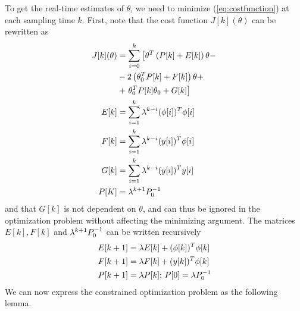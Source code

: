 \par
To get the real-time estimates of $\theta$, we need to minimize
(\ref{eq:costfunction}) at each sampling time $k$. First, note that the
cost function $J[k](\theta)$ can be rewritten as
\begin{equation}
    \begin{split}
        J[k](\theta) &= \sum\limits_{i=0}^k \left[
            \theta^T\left(P[k] + E[k]\right)\theta - \right.\\
        &- 2\left(\theta_0^TP[k] + F[k]\right)\theta +\\
        &+\left.\theta_0^TP[k]\theta_0 + G[k] \right]\\
        E[k] &= \sum\limits_{i=1}^{k} \lambda^{k-i}(\phi[i])^T\phi[i] \\
        F[k] &= \sum\limits_{i=1}^{k} \lambda^{k-i}(y[i])^T\phi[i] \\
        G[k] &= \sum\limits_{i=1}^{k} \lambda^{k-i}(y[i])^Ty[i] \\
        P[K] &= \lambda^{k+1}P_0^{-1}
    \end{split}
    \label{eq:EFG}
\end{equation}
and that $G[k]$ is not dependent on $\theta$, and can thus be ignored in the optimization
problem without affecting the minimizing argument. The matrices
$E[k], F[k]$ and $\lambda^{k+1}P_0^{-1}$ can be written recursively
\begin{align}
    E[k+1] &= \lambda E[k] + (\phi[k])^T\phi[k] \label{eq:Erec}\\
    F[k+1] &= \lambda F[k] + (y[k])^T\phi[k] \label{eq:Frec}\\
    P[k+1] &= \lambda P[k]; \, P[0] = \lambda P_0^{-1} \label{eq:Prec}
\end{align}
We can now express the constrained optimization problem as the following lemma.

